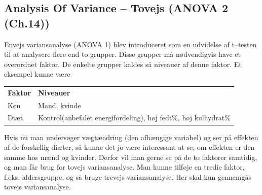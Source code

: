 \documentclass[11pt]{article}
\begin{document}
\subsection{Analysis Of Variance -- Tovejs (ANOVA 2 (Ch.14))}
Envejs variansanalyse (ANOVA 1) blev introduceret som en udvidelse af t--testen til at analysere flere end to grupper. Disse grupper må nødvendigvis have et overordnet faktor. De enkelte grupper kaldes så niveauer af denne faktor. Et eksempel kunne være 
\begin{table}[H]
\centering
\begin{tabular}{ll}
\textbf{Faktor} & \textbf{Niveauer}                                               \\
Køn             & Mand, kvinde                                                    \\
Diæt            & Kontrol(anbefalet energifordeling), høj fedt\%, høj kulhydrat\%
\end{tabular}
\end{table}
Hvis nu man undersøger vægtændring (den afhængige variabel) og ser på effekten af de forskellig diæter, så kunne det jo være interessant at se, om effekten er den samme hos mænd og kvinder. Derfor vil man gerne se på de to faktorer samtidig, og man får brug for tovejs variansanalyse. Man kunne tilføje en tredie faktor, f.eks. aldersgruppe, og så bruge trevejs variansanalyse. Her skal kun gennemgås tovejs variansanalyse.
\end{document}
